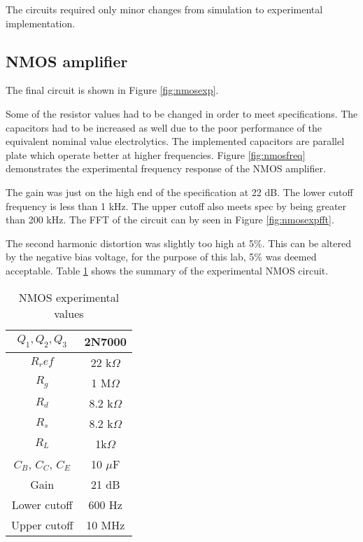 
The circuits required only minor changes from simulation to experimental implementation.	
	

\subsection{NMOS amplifier}
The final circuit is shown in Figure \ref{fig:nmosexp}.

Some of the resistor values had to be changed in order to meet specifications. The capacitors had to be increased as well due to the poor performance of the equivalent nominal value electrolytics. The implemented capacitors are parallel plate which operate better at higher frequencies. Figure \ref{fig:nmosfreq} demonstrates the experimental frequency response of the NMOS amplifier. 




The gain was just on the high end of the specification at 22 dB. The lower cutoff frequency is less than 1 kHz. The upper cutoff also meets spec by being greater than 200 kHz. The FFT of the circuit can by seen in Figure \ref{fig:nmosexpfft}.


The second harmonic distortion was slightly too high at 5\%. This can be altered by the negative bias voltage, for the purpose of this lab, 5\% was deemed acceptable. Table \ref{tab:nmosexp} shows the summary of the experimental NMOS circuit.


\begin{table}[H]
	\centering
	\caption{NMOS experimental values}
	\label{tab:nmosexp}
	\begin{tabular}{|c|c|}  \hline
		$Q_1, Q_2, Q_3$ & 2N7000        \\ \hline
		$R_ref$         & 22 k$\Omega$ \\ \hline
		$R_g$           & 1 M$\Omega$  \\ \hline
		$R_d$           & 8.2 k$\Omega$   \\ \hline
		$R_s$           & 8.2 k$\Omega$  \\ \hline
		$R_L$           & 1k$\Omega$    \\ \hline
		$C_B$, $C_C$, $C_E$ & 10 $\mu$F         \\ \hline   
		Gain            & 21 dB   \\   \hline
		Lower cutoff    & 600 Hz \\ \hline
		Upper cutoff    & 10  MHz \\ \hline
	\end{tabular}
\end{table}

